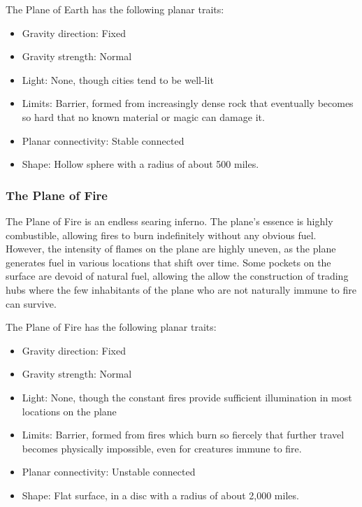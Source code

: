         The Plane of Earth has the following planar traits:
        \begin{itemize}
            \item Gravity direction: Fixed
            \item Gravity strength: Normal
            \item Light: None, though cities tend to be well-lit
            \item Limits: Barrier, formed from increasingly dense rock that eventually becomes so hard that no known material or magic can damage it.
            \item Planar connectivity: Stable connected
            \item Shape: Hollow sphere with a radius of about 500 miles.
        \end{itemize}

        \subsubsection{The Plane of Fire}
        The Plane of Fire is an endless searing inferno.
        The plane's essence is highly combustible, allowing fires to burn indefinitely without any obvious fuel.
        However, the intensity of flames on the plane are highly uneven, as the plane generates fuel in various locations that shift over time.
        Some pockets on the surface are devoid of natural fuel, allowing the allow the construction of trading hubs where the few inhabitants of the plane who are not naturally immune to fire can survive.

        The Plane of Fire has the following planar traits:
        \begin{itemize}
            \item Gravity direction: Fixed
            \item Gravity strength: Normal
            \item Light: None, though the constant fires provide sufficient illumination in most locations on the plane
            \item Limits: Barrier, formed from fires which burn so fiercely that further travel becomes physically impossible, even for creatures immune to fire.
            \item Planar connectivity: Unstable connected
            \item Shape: Flat surface, in a disc with a radius of about 2,000 miles.
        \end{itemize}

